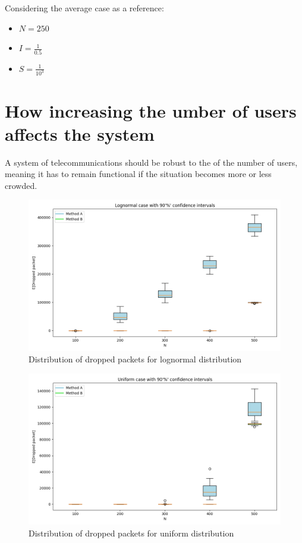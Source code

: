 \documentclass{report}
\begin{document}
Considering the average case as a reference:
\begin{itemize}
    \item $N=250$
    \item $I=\frac{1}{0.5}$
    \item $S=\frac{1}{10^3}$
\end{itemize}

\section{How increasing the umber of users affects the system}
A system of telecommunications should be robust to the of the number of users, meaning it has to remain functional if the situation becomes more or less crowded.

\begin{figure}[H]
    \centering
    \includegraphics[width=\textwidth]{img/Grafici/DroppedPacket Lognormal Small.png}
    \caption{Distribution of dropped packets for lognormal distribution}
\end{figure}
\begin{figure}[H]
    \centering
    \includegraphics[width=\textwidth]{img/Grafici/DroppedPacket Uniform differentScale Small.png}
    \caption{Distribution of dropped packets for uniform distribution}
\end{figure}
\end{document}

